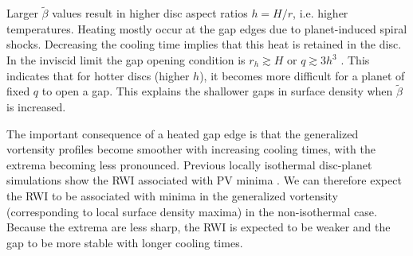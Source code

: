 
Larger $\tilde\beta$ values result in higher disc aspect ratios $h=H/r$,
i.e. higher temperatures. Heating mostly occur at the gap edges
due to planet-induced spiral shocks. Decreasing the cooling time
implies that this heat is retained in the disc. In the inviscid limit the gap
opening condition is $r_h\gtrsim H$ or $q\gtrsim 3h^3$
\citep{crida06}. 
This indicates that for hotter discs (higher
$h$), it becomes more difficult for a planet of fixed $q$ to open a
gap. This explains the shallower gaps in surface density when
$\tilde{\beta}$ is increased. 


The important consequence of a heated gap edge is that the
generalized vortensity profiles become smoother with increasing
cooling times, with the extrema becoming less pronounced. Previous locally
isothermal disc-planet simulations show the RWI associated with PV
minima \citep{li05,lin10}. We can therefore expect the RWI to be associated with
minima in the generalized vortensity (corresponding to local surface
density maxima) in the non-isothermal case. Because the extrema are
less sharp, the RWI is expected to be weaker and the gap to be more
stable with longer cooling times.  


